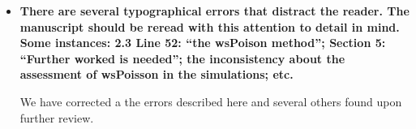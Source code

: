\documentclass[11pt]{article}
\begin{document}
\begin{itemize}
\begin{itemize}
        \item \textbf{There are several typographical errors that distract the reader. The manuscript should be reread with this attention to detail in mind. Some instances: 2.3 Line 52: “the wsPoison method”; Section 5: “Further worked is needed”; the inconsistency about the assessment of wsPoisson in the simulations; etc.}
        
        We have corrected a the errors described here and several others found upon further review.

    \end{itemize}
\end{itemize}
\end{document}
